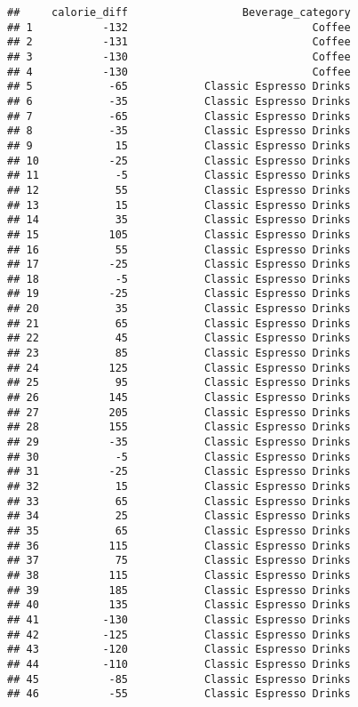 \documentclass[
]{article}
\begin{document}
\begin{verbatim}
##     calorie_diff                  Beverage_category
## 1           -132                             Coffee
## 2           -131                             Coffee
## 3           -130                             Coffee
## 4           -130                             Coffee
## 5            -65            Classic Espresso Drinks
## 6            -35            Classic Espresso Drinks
## 7            -65            Classic Espresso Drinks
## 8            -35            Classic Espresso Drinks
## 9             15            Classic Espresso Drinks
## 10           -25            Classic Espresso Drinks
## 11            -5            Classic Espresso Drinks
## 12            55            Classic Espresso Drinks
## 13            15            Classic Espresso Drinks
## 14            35            Classic Espresso Drinks
## 15           105            Classic Espresso Drinks
## 16            55            Classic Espresso Drinks
## 17           -25            Classic Espresso Drinks
## 18            -5            Classic Espresso Drinks
## 19           -25            Classic Espresso Drinks
## 20            35            Classic Espresso Drinks
## 21            65            Classic Espresso Drinks
## 22            45            Classic Espresso Drinks
## 23            85            Classic Espresso Drinks
## 24           125            Classic Espresso Drinks
## 25            95            Classic Espresso Drinks
## 26           145            Classic Espresso Drinks
## 27           205            Classic Espresso Drinks
## 28           155            Classic Espresso Drinks
## 29           -35            Classic Espresso Drinks
## 30            -5            Classic Espresso Drinks
## 31           -25            Classic Espresso Drinks
## 32            15            Classic Espresso Drinks
## 33            65            Classic Espresso Drinks
## 34            25            Classic Espresso Drinks
## 35            65            Classic Espresso Drinks
## 36           115            Classic Espresso Drinks
## 37            75            Classic Espresso Drinks
## 38           115            Classic Espresso Drinks
## 39           185            Classic Espresso Drinks
## 40           135            Classic Espresso Drinks
## 41          -130            Classic Espresso Drinks
## 42          -125            Classic Espresso Drinks
## 43          -120            Classic Espresso Drinks
## 44          -110            Classic Espresso Drinks
## 45           -85            Classic Espresso Drinks
## 46           -55            Classic Espresso Drinks

\end{verbatim}
\end{document}
